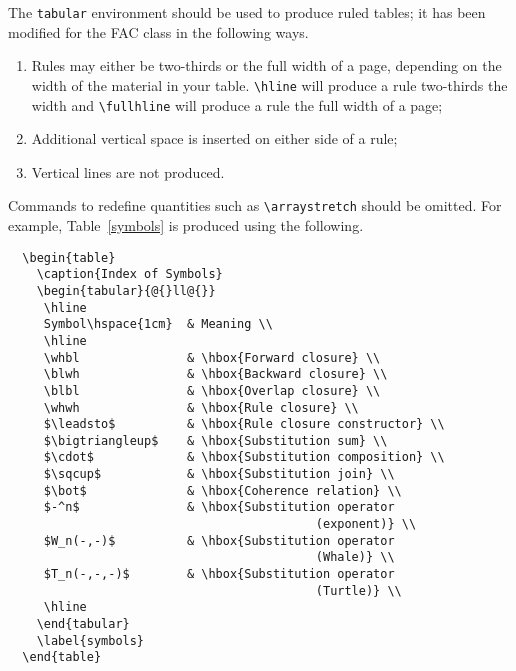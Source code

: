 \documentclass{fac}
\newcommand\black{\ensuremath{\blacktriangleright}}
\newcommand\white{\ensuremath{\vartriangleright}}
\newcommand\whbl{\white\kern-.1em--\kern-.1em\black}
\newcommand\blwh{\black\kern-.1em--\kern-.1em\white}
\newcommand\blbl{\black\kern-.1em--\kern-.1em\black}
\newcommand\whwh{\white\kern-.1em--\kern-.1em\white}
\newcommand\whbl{\white\kern-.125em--\kern-.125em\black}%
\newcommand\blwh{\black\kern-.125em--\kern-.125em\white}%
\newcommand\blbl{\black\kern-.125em--\kern-.125em\black}%
\newcommand\whwh{\white\kern-.125em--\kern-.125em\white}}
\begin{document}
The \verb"tabular" environment should be used to produce ruled tables;
it has been modified for the FAC class in the following ways.
%
\begin{enumerate}
  \item Rules may either be two-thirds or the full width of a page,
depending on the width of the material in your table. \verb"\hline"
will produce a rule two-thirds the width and \verb"\fullhline" will
produce a rule the full width of a page;
  \item Additional vertical space is inserted on either side of a rule;
  \item Vertical lines are not produced.
\end{enumerate}
%
Commands to redefine quantities such as \verb"\arraystretch" should be
omitted. For example, Table~\ref{symbols} is produced using the following.
%
\begin{verbatim}
  \begin{table}
    \caption{Index of Symbols}
    \begin{tabular}{@{}ll@{}}
     \hline
     Symbol\hspace{1cm}  & Meaning \\
     \hline
     \whbl               & \hbox{Forward closure} \\
     \blwh               & \hbox{Backward closure} \\
     \blbl               & \hbox{Overlap closure} \\
     \whwh               & \hbox{Rule closure} \\
     $\leadsto$          & \hbox{Rule closure constructor} \\
     $\bigtriangleup$    & \hbox{Substitution sum} \\
     $\cdot$             & \hbox{Substitution composition} \\
     $\sqcup$            & \hbox{Substitution join} \\
     $\bot$              & \hbox{Coherence relation} \\
     $-^n$               & \hbox{Substitution operator
                                           (exponent)} \\
     $W_n(-,-)$          & \hbox{Substitution operator
                                           (Whale)} \\
     $T_n(-,-,-)$        & \hbox{Substitution operator
                                           (Turtle)} \\
     \hline
    \end{tabular}
    \label{symbols}
  \end{table}
\end{verbatim}
\end{document}
